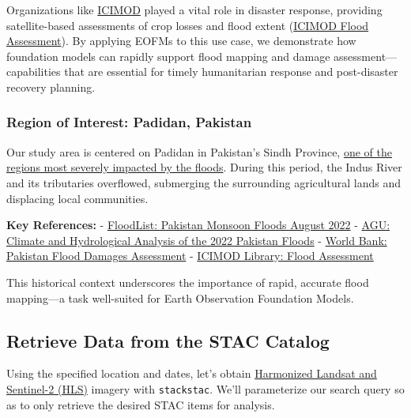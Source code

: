 \documentclass[
  letterpaper,
  DIV=11,
  numbers=noendperiod]{scrreprt}
\begin{document}
Organizations like \href{https://www.icimod.org/}{ICIMOD} played a vital
role in disaster response, providing satellite-based assessments of crop
losses and flood extent
(\href{https://lib.icimod.org/records/qv11m-0wm93}{ICIMOD Flood
Assessment}). By applying EOFMs to this use case, we demonstrate how
foundation models can rapidly support flood mapping and damage
assessment---capabilities that are essential for timely humanitarian
response and post-disaster recovery planning.

\subsubsection{Region of Interest: Padidan,
Pakistan}\label{region-of-interest-padidan-pakistan}

Our study area is centered on Padidan in Pakistan's Sindh Province,
\href{https://floodlist.com/asia/pakistan-monsoon-floods-august-2022}{one
of the regions most severely impacted by the floods}. During this
period, the Indus River and its tributaries overflowed, submerging the
surrounding agricultural lands and displacing local communities.

\textbf{Key References:} -
\href{https://floodlist.com/asia/pakistan-monsoon-floods-august-2022}{FloodList:
Pakistan Monsoon Floods August 2022} -
\href{https://agupubs.onlinelibrary.wiley.com/doi/full/10.1029/2022EF003230}{AGU:
Climate and Hydrological Analysis of the 2022 Pakistan Floods} -
\href{https://www.worldbank.org/en/news/press-release/2022/10/28/pakistan-flood-damages-and-economic-losses-over-usd-30-billion-and-reconstruction-needs-over-usd-16-billion-new-assessme}{World
Bank: Pakistan Flood Damages Assessment} -
\href{https://lib.icimod.org/records/qv11m-0wm93}{ICIMOD Library: Flood
Assessment}

This historical context underscores the importance of rapid, accurate
flood mapping---a task well-suited for Earth Observation Foundation
Models.

\subsection{Retrieve Data from the STAC
Catalog}\label{retrieve-data-from-the-stac-catalog}

Using the specified location and dates, let's obtain
\href{https://hls.gsfc.nasa.gov/}{Harmonized Landsat and Sentinel-2
(HLS)} imagery with \texttt{stackstac}. We'll parameterize our search
query so as to only retrieve the desired STAC items for analysis.
\end{document}
